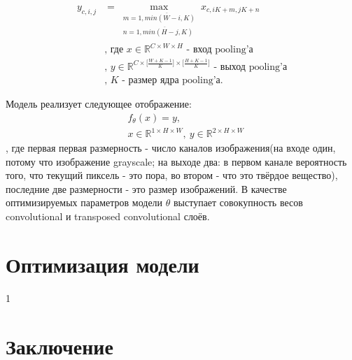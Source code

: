 \documentclass[14pt, a4paper, oneside, bold]{extarticle}
\begin{document}
\begin{equation} \label{pooling}
\begin{aligned}
	y_{c, i, j} & = \max \limits_{
		\substack{
			m=\overline{1, min(W - i, K)}
			\\ n=\overline{1, min(H - j, K)}}}
		x_{c, i K + m, j K + n} \\
	& \text{, где $x \in \mathbb{R}^{C \times W \times H}$ 
		- вход pooling'а} \\
	& \text{, $y \in \mathbb{R}
		^{C 
		  \times \bigl[ \frac{W + K - 1}{K} \bigr] 
		  \times \bigl[ \frac{H + K - 1}{K} \bigr] }$ 
		- выход pooling'а} \\
	& \text{, $K$ - размер ядра pooling'а}.
\end{aligned}
\end{equation}

Модель реализует следующее отображение: 
\begin{equation} \label{model}
\begin{aligned}
	& f_{\theta}(x) = y, \\
	& x \in \mathbb{R}^{1 \times H \times W}
		,\ y \in 
		\mathbb{R}^{2 \times H \times W}
\end{aligned}
\end{equation}
, где первая первая размерность - число каналов изображения(на входе один, потому что изображение grayscale; на выходе два: в первом канале вероятность того, что текущий пиксель - это пора, во втором - что это твёрдое вещество), последние две размерности - это размер изображений. В качестве оптимизируемых параметров модели $\theta$ выступает совокупность весов convolutional и transposed convolutional слоёв.

\newpage


\section{Оптимизация модели}

1

\newpage


\section{Заключение}
\end{document}
